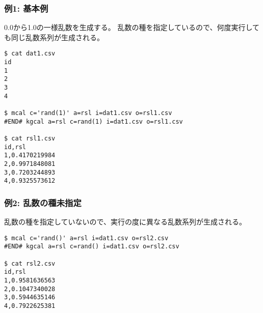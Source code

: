 
\subsubsection*{例1: 基本例}

0.0から1.0の一様乱数を生成する。
乱数の種を指定しているので、何度実行しても同じ乱数系列が生成される。

\begin{Verbatim}[baselinestretch=0.7,frame=single]
$ cat dat1.csv
id
1
2
3
4

$ mcal c='rand(1)' a=rsl i=dat1.csv o=rsl1.csv
#END# kgcal a=rsl c=rand(1) i=dat1.csv o=rsl1.csv

$ cat rsl1.csv
id,rsl
1,0.4170219984
2,0.9971848081
3,0.7203244893
4,0.9325573612
\end{Verbatim}

\subsubsection*{例2: 乱数の種未指定}

乱数の種を指定していないので、実行の度に異なる乱数系列が生成される。

\begin{Verbatim}[baselinestretch=0.7,frame=single]
$ mcal c='rand()' a=rsl i=dat1.csv o=rsl2.csv
#END# kgcal a=rsl c=rand() i=dat1.csv o=rsl2.csv

$ cat rsl2.csv
id,rsl
1,0.9581636563
2,0.1047340028
3,0.5944635146
4,0.7922625381
\end{Verbatim}
